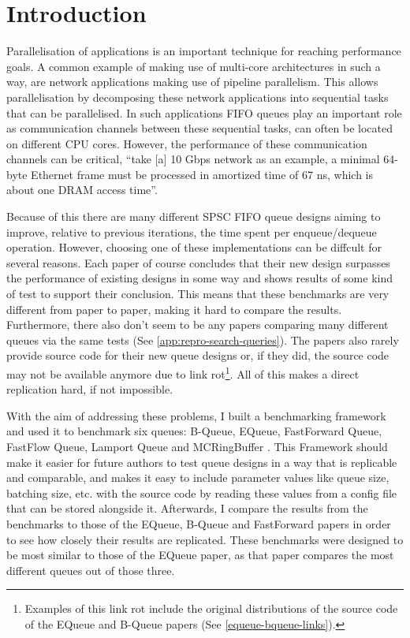 \section{Introduction}
\label{sec:introduction}
Parallelisation of applications is an important technique for reaching performance goals.
A common example of making use of multi-core architectures in such a way, are network applications making use
of pipeline parallelism\cite{Upadhyaya2007,WangCheng2009}.
This allows parallelisation by decomposing these network applications into sequential tasks that can be
parallelised\cite{WangCheng2009}.
In such applications FIFO queues play an important role as communication channels between these sequential
tasks, can often be located on different CPU cores.
However, the performance of these communication channels can be critical, ``take [a] 10 Gbps network as an
example, a minimal 64-byte Ethernet frame must be processed in amortized time of 67 ns, which is about one
DRAM access time''\cite{B-Queue}.

Because of this there are many different SPSC FIFO queue designs aiming to improve, relative to previous
iterations, the time spent per enqueue/dequeue operation\cite{B-Queue,EQueue,FastForward,FastFlowGithub,MCRingBuffer}.
However, choosing one of these implementations can be diffcult for several reasons.
Each paper of course concludes that their new design surpasses the performance of existing designs in some
way and shows results of some kind of test to support their conclusion.
This means that these benchmarks are very different from paper to paper, making it hard to compare the results.
Furthermore, there also don't seem to be any papers comparing many different queues via the same tests (See
\autoref{app:repro-search-queries}).
The papers also rarely provide source code for their new queue designs or, if they did, the source code may
not be available anymore
due to link rot\footnote{Examples of this link rot include the original distributions of the source code of
the EQueue and B-Queue papers (See \autoref{equeue-bqueue-links}).}.
All of this makes a direct replication hard, if not impossible\cite{sep-scientific-reproducibility}.

With the aim of addressing these problems, I built a benchmarking framework and used it to benchmark six
queues: B-Queue, EQueue, FastForward Queue, FastFlow Queue, Lamport Queue and MCRingBuffer
\cite{B-Queue,EQueue,FastForward,FastFlowGithub,Lamport,MCRingBuffer}.
This Framework should make it easier for future authors to test queue designs in a way that is replicable and
comparable, and makes it easy to include parameter values like queue size, batching size, etc. with the
source code by reading these values from a config file that can be stored alongside it.
Afterwards, I compare the results from the benchmarks to those of the EQueue, B-Queue and FastForward papers
in order to see how closely their results are replicated.
These benchmarks were designed to be most similar to those of the EQueue paper, as that paper compares the
most different queues out of those three.

